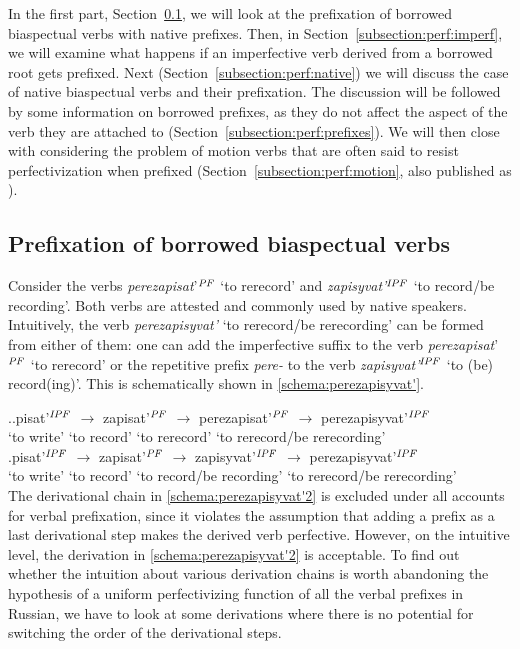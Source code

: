 In the first part, Section~\ref{subsection:perf:borrowed}, we will look at the prefixation of borrowed biaspectual verbs with native prefixes. Then, in Section~\ref{subsection:perf:imperf}, we will examine what happens if an imperfective verb derived from a borrowed root gets prefixed. Next (Section~\ref{subsection:perf:native}) we will discuss the case of native biaspectual verbs and their prefixation. The discussion will be followed by some information on borrowed prefixes, as they do not affect the aspect of the verb they are attached to (Section~\ref{subsection:perf:prefixes}). We will then close with considering the problem of motion verbs that are often said to resist perfectivization when prefixed (Section~\ref{subsection:perf:motion}, also published as \citealt{ZinovaOsswald:paper}).

\subsection{Prefixation of borrowed biaspectual verbs}\label{subsection:perf:borrowed}
Consider the verbs \textit{perezapisat}'$^{\mathit{PF}}$ `to rerecord' and \textit{zapisyvat'}$^{\mathit{IPF}}$ `to  record/be recording'. Both verbs are attested and commonly used by native speakers. Intuitively, the verb \textit{perezapisyvat'} `to rerecord/be rerecording' can be formed from either of them: one can add the imperfective suffix to the verb \textit{perezapisat}'$^{\mathit{PF}}$ `to rerecord' or the repetitive prefix \textit{pere-} to the verb \textit{zapisyvat'}$^{\mathit{IPF}}$ `to (be) record(ing)'. This is schematically shown in \ref{schema:perezapisyvat'}.

\ex.\label{schema:perezapisyvat'}\ag.\label{schema:perezapisyvat'1}pisat'$^{{\mathit{IPF}}}$ {$\rightarrow$} zapisat'$^{\mathit{PF}}$ {$\rightarrow$} perezapisat'$^{\mathit{PF}}$ {$\rightarrow$} perezapisyvat'$^{\mathit{IPF}}$ \\
{`to write'} {} {`to record'} {} {`to rerecord'} {} {`to rerecord/be rerecording'}\\
\bg.\label{schema:perezapisyvat'2}pisat'$^{{\mathit{IPF}}}$ {$\rightarrow$} zapisat'$^{\mathit{PF}}$ {$\rightarrow$} zapisyvat'$^{\mathit{IPF}}$ {$\rightarrow$} perezapisyvat'$^{\mathit{IPF}}$ \\
{`to write'} {} {`to record'} {} {`to record/be recording'} {} {`to rerecord/be rerecording'}\\

The derivational chain in \ref{schema:perezapisyvat'2} is excluded under all accounts for verbal prefixation, since it violates the assumption that adding a prefix as a last derivational step makes the derived verb perfective. However, on the intuitive level, the derivation in \ref{schema:perezapisyvat'2} is acceptable. To find out whether the intuition about various derivation chains is worth abandoning the hypothesis of a uniform perfectivizing function of all the verbal prefixes in Russian, we have to look at some derivations where there is no potential for switching the order of the derivational steps.

